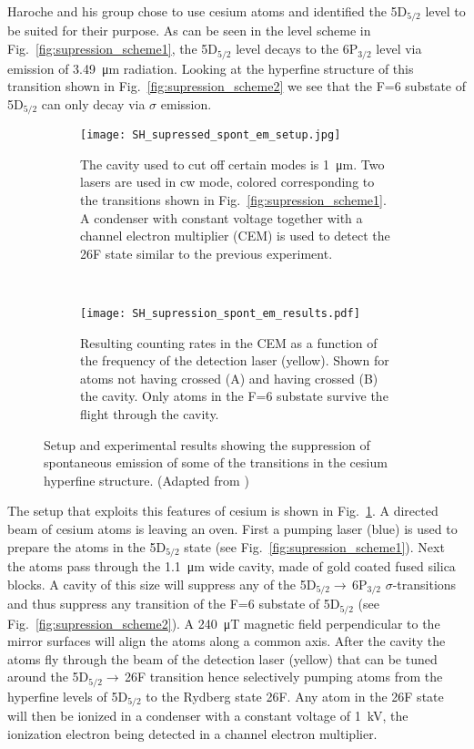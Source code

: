 Haroche and his group chose to use cesium atoms and identified the 5D$_{5/2}$
level to be suited for their purpose. As can be seen in the level scheme in
Fig.~\ref{fig:supression_scheme1}, the 5D$_{5/2}$ level decays to the 6P$_{3/2}$
level via emission of \SI{3.49}{\micro\meter} radiation. Looking at the
hyperfine structure of this transition  shown in
Fig.~\ref{fig:supression_scheme2} we see that the F=6 substate of
5D$_{5/2}$ can only decay via $\sigma$ emission.  


\begin{figure}[t]
  \centering
  \begin{subfigure}[t]{.48\linewidth}
    \centering
    \texttt{[image: SH\_supressed\_spont\_em\_setup.jpg]}
    \caption{The cavity used to cut off certain modes is \SI{1}{\micro\m}. Two
    lasers are used in cw mode, colored corresponding to the transitions shown
    in Fig.~\ref{fig:supression_scheme1}. A condenser with constant voltage
    together with a channel electron multiplier (CEM) is
    used to detect the 26F state similar to the previous experiment.}
    \label{fig:supression_setup}
  \end{subfigure}
  ~
  \begin{subfigure}[t]{.48\linewidth}
    \centering
    \texttt{[image: SH\_supression\_spont\_em\_results.pdf]}
    \caption{Resulting counting rates in the CEM as a function of the frequency
      of the detection laser (yellow). Shown for atoms not having crossed (A) and having
  crossed (B) the cavity. Only atoms in the F=6 substate survive the flight
through the cavity.}
  \label{fig:supression_results}
  \end{subfigure}
  \caption{Setup and experimental results showing the suppression of spontaneous
  emission of some of the transitions in the cesium hyperfine structure.
  (Adapted from \cite{haroche1987SupressedEmission})}
\end{figure}
The setup that exploits this features of cesium is shown in
Fig.~\ref{fig:supression_setup}. A directed beam of cesium atoms is leaving an
oven. First a pumping laser (blue) is used to prepare the
atoms in the 5D$_{5/2}$ state (see Fig.~\ref{fig:supression_scheme1}). Next the
atoms pass through the \SI{1.1}{\micro\meter} wide cavity, made of gold coated
fused silica blocks. A cavity of this size will suppress any of the
5D$_{5/2}\rightarrow$\,6P$_{3/2}$ $\sigma$-transitions and thus suppress any
transition of the F=6 substate of 5D$_{5/2}$ (see
Fig.~\ref{fig:supression_scheme2}). A \SI{240}{\micro\tesla} magnetic field
perpendicular to the mirror surfaces will align the atoms along a common axis.
After the cavity the atoms fly through the beam of the detection laser (yellow)
that can be tuned around the 5D$_{5/2}\rightarrow$\,26F transition hence
selectively pumping atoms from the hyperfine levels of 5D$_{5/2}$ to the Rydberg
state 26F. Any atom in the 26F state will then be ionized in a condenser with a
constant voltage of \SI{1}{\kilo\volt}, the ionization electron being detected
in a channel electron multiplier.

